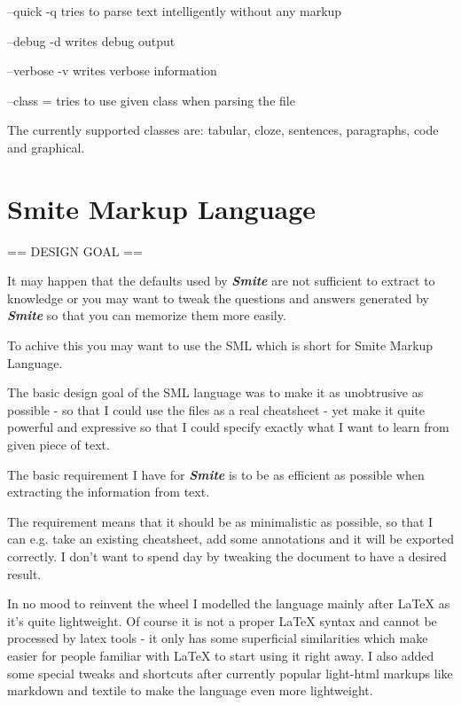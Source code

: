 \documentclass[a4paper,11pt]{article}
\newcommand{\smite}{\emph{\textbf{Smite{}}}}
\begin{document}
--quick -q tries to parse text intelligently without any markup

--debug -d writes debug output

--verbose -v writes verbose information


--class = tries to use given class when parsing the file

The currently supported classes are: tabular, cloze, sentences, paragraphs,
code and graphical.




\section{Smite Markup Language}

==  DESIGN GOAL ==

It may happen that the defaults used by \smite{} are not sufficient to extract
to knowledge or you may want to tweak the questions and answers generated by
\smite{} so that you can memorize them more easily.

To achive this you may want to use the SML which is short for Smite Markup
Language.



The basic design goal of the SML language was to make it as unobtrusive as
possible - so that I could use the files as a real cheatsheet - yet make it
quite powerful and expressive so that I could specify exactly what I want to
learn from given piece of text.


The basic requirement I have for \smite{} is to be as efficient as possible
when extracting the information from text.

The requirement means that it should be as minimalistic as possible, so that I
can e.g. take an existing cheatsheet, add some annotations and it will be
exported correctly. I don't want to spend day by tweaking the document to have
a desired result.

In no mood to reinvent the wheel I modelled the language mainly after LaTeX as
it's quite lightweight. Of course it is not a proper LaTeX syntax and cannot be
processed by latex tools - it only has some superficial similarities which make
easier for people familiar with LaTeX to start using it right away.  I also
added some special tweaks and shortcuts after currently popular light-html
markups like markdown and textile to make the language even more lightweight.
\end{document}

